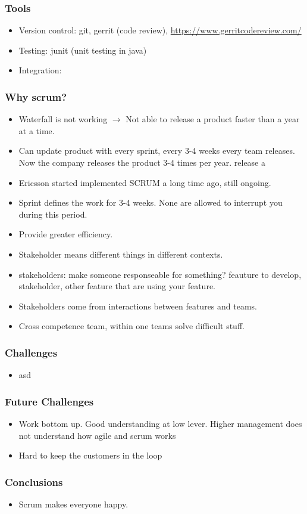 \documentclass{beamer}
\begin{document}
\begin{frame}
  \frametitle{Tools}
  \begin{itemize}
  \item Version control: git, gerrit (code review), \url{https://www.gerritcodereview.com/}
  \item Testing: junit (unit
    testing in java)
  \item Integration:
  \end{itemize}
\end{frame}

\begin{frame}
  \frametitle{Why scrum?}
  \begin{itemize}

  \item Waterfall is not working $\rightarrow$ Not able to release a
    product faster than a year at a time.
  \item Can update product with every sprint, every 3-4 weeks every
    team releases. Now the company releases the product 3-4 times per year.
    release a
  \item Ericsson started implemented SCRUM a long time ago, still
    ongoing.
  \item Sprint defines the work for 3-4 weeks. None are allowed to
    interrupt you during this period.
  \item Provide greater efficiency.
  \item Stakeholder means different things in different contexts.
  \item stakeholders: make someone responseable for something?
    feauture to develop, stakeholder, other feature that are using
    your feature.
  \item Stakeholders come from interactions between features and teams.
  \item Cross competence team, within one teams solve difficult stuff.

  \end{itemize}
\end{frame}

\begin{frame}
  \frametitle{Challenges}
  \begin{itemize}
  \item asd
  \end{itemize}
\end{frame}

\begin{frame}
  \frametitle{Future Challenges}
  \begin{itemize}
  \item Work bottom up. Good understanding at low lever. Higher
    management does not understand how agile and scrum works
  \item Hard to keep the customers in the loop
  \end{itemize}
\end{frame}

\begin{frame}
  \frametitle{Conclusions}
  \begin{itemize}
  \item Scrum makes everyone happy.
  \end{itemize}
\end{frame}
\end{document}
